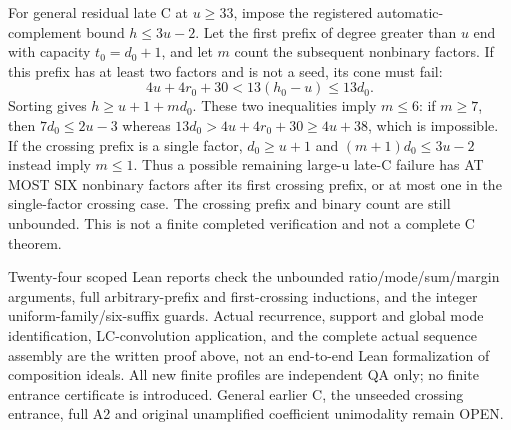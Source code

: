 For general residual late C at $u\ge33$, impose the registered
automatic-complement bound $h\le3u-2$.
Let the first prefix of degree greater than $u$ end with capacity
$t_0=d_0+1$, and let $m$ count the subsequent nonbinary factors.
If this prefix has at least two factors and is not a seed, its
cone must fail:
\[
 4u+4r_0+30<13(h_0-u)\le13d_0.
\]
Sorting gives $h\ge u+1+md_0$. These two inequalities imply
$m\le6$: if $m\ge7$, then $7d_0\le2u-3$ whereas
$13d_0>4u+4r_0+30\ge4u+38$, which is impossible.
If the crossing prefix is a single factor, $d_0\ge u+1$ and
$(m+1)d_0\le3u-2$ instead imply $m\le1$.
Thus a possible remaining large-u late-C failure has AT MOST SIX
nonbinary factors after its first crossing prefix, or at most one
in the single-factor crossing case.
The crossing prefix and binary count are still unbounded.
This is not a finite completed verification and not a complete C theorem.

Twenty-four scoped Lean reports check the unbounded ratio/mode/sum/margin
arguments, full arbitrary-prefix and first-crossing inductions, and
the integer uniform-family/six-suffix guards. Actual recurrence,
support and global mode identification, LC-convolution application,
and the complete actual sequence assembly are the written proof above,
not an end-to-end Lean formalization of composition ideals.
All new finite profiles are independent QA only; no finite entrance
certificate is introduced. General earlier C, the unseeded crossing
entrance, full A2 and original unamplified coefficient unimodality
remain OPEN.

